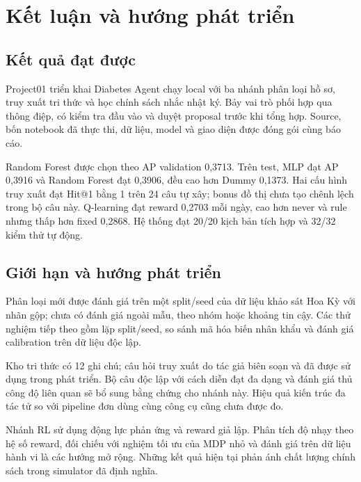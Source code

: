 \chapter{Kết luận và hướng phát triển}
\section{Kết quả đạt được}
Project01 triển khai Diabetes Agent chạy local với ba nhánh phân loại hồ sơ, truy xuất tri thức và học chính sách nhắc nhật ký. Bảy vai trò phối hợp qua thông điệp, có kiểm tra đầu vào và duyệt proposal trước khi tổng hợp. Source, bốn notebook đã thực thi, dữ liệu, model và giao diện được đóng gói cùng báo cáo.

Random Forest được chọn theo AP validation 0,3713. Trên test, MLP đạt AP 0,3916 và Random Forest đạt 0,3906, đều cao hơn Dummy 0,1373. Hai cấu hình truy xuất đạt Hit@1 bằng 1 trên 24 câu tự xây; bonus đồ thị chưa tạo chênh lệch trong bộ câu này. Q-learning đạt reward 0,2703 mỗi ngày, cao hơn never và rule nhưng thấp hơn fixed 0,2868. Hệ thống đạt 20/20 kịch bản tích hợp và 32/32 kiểm thử tự động.

\section{Giới hạn và hướng phát triển}
Phân loại mới được đánh giá trên một split/seed của dữ liệu khảo sát Hoa Kỳ với nhãn gộp; chưa có đánh giá ngoài mẫu, theo nhóm hoặc khoảng tin cậy. Các thử nghiệm tiếp theo gồm lặp split/seed, so sánh mã hóa biến nhân khẩu và đánh giá calibration trên dữ liệu độc lập.

Kho tri thức có 12 ghi chú; câu hỏi truy xuất do tác giả biên soạn và đã được sử dụng trong phát triển. Bộ câu độc lập với cách diễn đạt đa dạng và đánh giá thủ công độ liên quan sẽ bổ sung bằng chứng cho nhánh này. Hiệu quả kiến trúc đa tác tử so với pipeline đơn dùng cùng công cụ cũng chưa được đo.

Nhánh RL sử dụng động lực phản ứng và reward giả lập. Phân tích độ nhạy theo hệ số reward, đối chiếu với nghiệm tối ưu của MDP nhỏ và đánh giá trên dữ liệu hành vi là các hướng mở rộng. Những kết quả hiện tại phản ánh chất lượng chính sách trong simulator đã định nghĩa.
